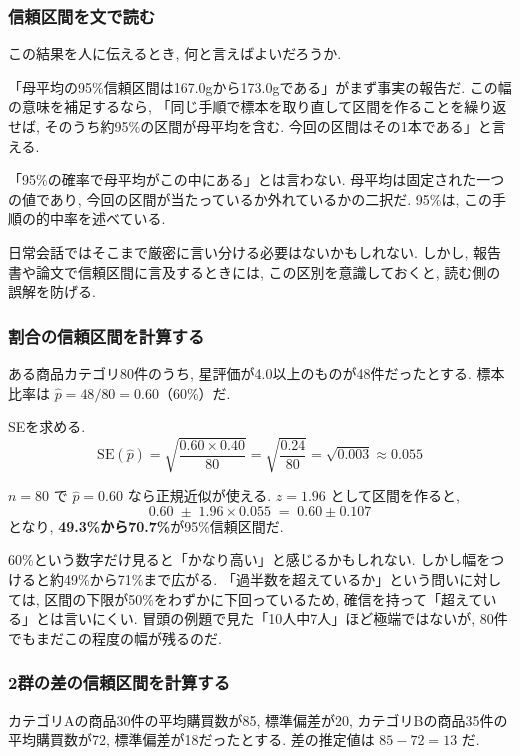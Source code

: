 \subsubsection{信頼区間を文で読む}

この結果を人に伝えるとき, 何と言えばよいだろうか.

「母平均の95\%信頼区間は167.0gから173.0gである」がまず事実の報告だ.
この幅の意味を補足するなら, 「同じ手順で標本を取り直して区間を作ることを繰り返せば, そのうち約95\%の区間が母平均を含む. 今回の区間はその1本である」と言える.

「95\%の確率で母平均がこの中にある」とは言わない.
母平均は固定された一つの値であり, 今回の区間が当たっているか外れているかの二択だ.
95\%は, この手順の的中率を述べている.

日常会話ではそこまで厳密に言い分ける必要はないかもしれない.
しかし, 報告書や論文で信頼区間に言及するときには, この区別を意識しておくと, 読む側の誤解を防げる.

\subsubsection{割合の信頼区間を計算する}

ある商品カテゴリ80件のうち, 星評価が4.0以上のものが48件だったとする.
標本比率は $\hat{p} = 48/80 = 0.60$（60\%）だ.

SEを求める.
\[
  \mathrm{SE}(\hat{p}) = \sqrt{\frac{0.60 \times 0.40}{80}} = \sqrt{\frac{0.24}{80}} = \sqrt{0.003} \approx 0.055
\]

$n = 80$ で $\hat{p} = 0.60$ なら正規近似が使える.
$z = 1.96$ として区間を作ると,
\[
  0.60 \;\pm\; 1.96 \times 0.055 \;=\; 0.60 \pm 0.107
\]
となり, \textbf{49.3\%から70.7\%}が95\%信頼区間だ.

60\%という数字だけ見ると「かなり高い」と感じるかもしれない.
しかし幅をつけると約49\%から71\%まで広がる.
「過半数を超えているか」という問いに対しては, 区間の下限が50\%をわずかに下回っているため, 確信を持って「超えている」とは言いにくい.
冒頭の例題で見た「10人中7人」ほど極端ではないが, 80件でもまだこの程度の幅が残るのだ.

\subsubsection{2群の差の信頼区間を計算する}

カテゴリAの商品30件の平均購買数が85, 標準偏差が20, カテゴリBの商品35件の平均購買数が72, 標準偏差が18だったとする.
差の推定値は $85 - 72 = 13$ だ.

